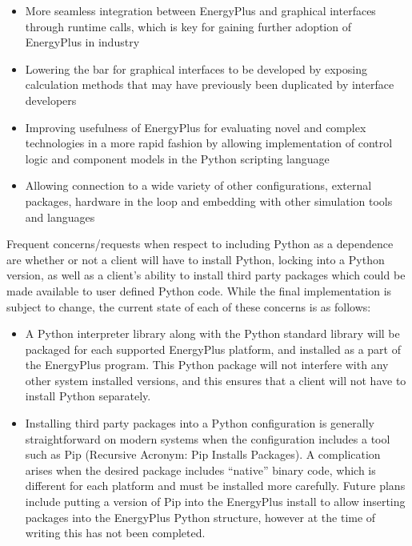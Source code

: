 \documentclass[5p, authoryear]{elsarticle}
\begin{document}
\begin{itemize}
 \item More seamless integration between EnergyPlus and graphical interfaces through runtime calls, which is key for gaining further adoption of EnergyPlus in industry
 \item Lowering the bar for graphical interfaces to be developed by exposing calculation methods that may have previously been duplicated by interface developers
 \item Improving usefulness of EnergyPlus for evaluating novel and complex technologies in a more rapid fashion by allowing implementation of control logic and component models in the Python scripting language
 \item Allowing connection to a wide variety of other configurations, external packages, hardware in the loop and embedding with other simulation tools and languages
\end{itemize}

Frequent concerns/requests when respect to including Python as a dependence are whether or not a client will have to install Python, locking into a Python version, as well as a client’s ability to install third party packages which could be made available to user defined Python code.  While the final implementation is subject to change, the current state of each of these concerns is as follows:

\begin{itemize}
 \item A Python interpreter library along with the Python standard library will be packaged for each supported EnergyPlus platform, and installed as a part of the EnergyPlus program.  This Python package will not interfere with any other system installed versions, and this ensures that a client will not have to install Python separately.
 \item Installing third party packages into a Python configuration is generally straightforward on modern systems when the configuration includes a tool such as Pip (Recursive Acronym: Pip Installs Packages).  A complication arises when the desired package includes “native” binary code, which is different for each platform and must be installed more carefully.  Future plans include putting a version of Pip into the EnergyPlus install to allow inserting packages into the EnergyPlus Python structure, however at the time of writing this has not been completed.
\end{itemize}

 
 
\end{document}
